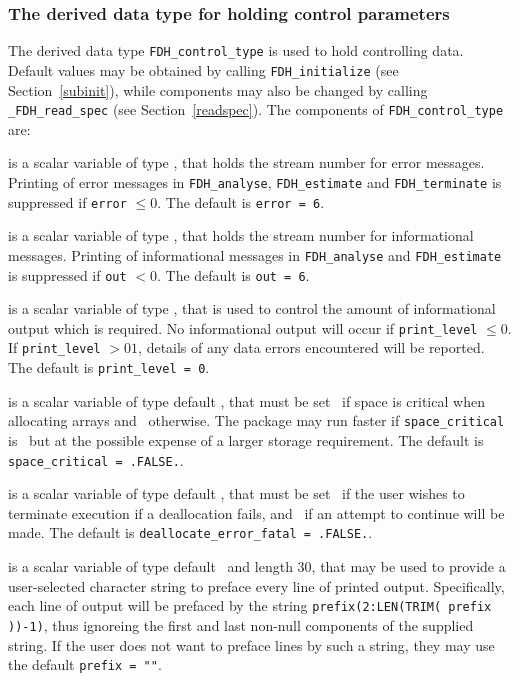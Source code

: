 \documentclass{galahad}
\newcommand{\packagename}{FDH}
\newcommand{\fullpackagename}{\libraryname\_\packagename}
\begin{document}

\subsubsection{The derived data type for holding control 
 parameters}\label{typecontrol}
The derived data type 
{\tt \packagename\_control\_type} 
is used to hold controlling data. Default values may be obtained by calling 
{\tt \packagename\_initialize}
(see Section~\ref{subinit}),
while components may also be changed by calling 
{\tt \fullpackagename\_read\-\_spec}
(see Section~\ref{readspec}). 
The components of 
{\tt \packagename\_control\_type} 
are:


\begin{description}

 is a scalar variable of type \integer, that holds the
stream number for error messages. Printing of error messages in 
{\tt \packagename\_analyse},
{\tt \packagename\_estimate} 
and {\tt \packagename\_terminate} 
is suppressed if {\tt error} $\leq 0$.
The default is {\tt error = 6}.

 is a scalar variable of type \integer, that holds the
stream number for informational messages. Printing of informational messages in 
{\tt \packagename\_analyse} and {\tt \packagename\_estimate} 
is suppressed if {\tt out} $< 0$.
The default is {\tt out = 6}.

 is a scalar variable of type \integer, that is used
to control the amount of informational output which is required. No 
informational output will occur if {\tt print\_level} $\leq 0$. If 
{\tt print\_level} $> 01$, details of any data errors encountered 
will be reported.
The default is {\tt print\_level = 0}.

 is a scalar variable of type default \logical, 
that must be set \true\ if space is critical when allocating arrays
and  \false\ otherwise. The package may run faster if 
{\tt space\_critical} is \false\ but at the possible expense of a larger
storage requirement. The default is {\tt space\_critical = .FALSE.}.

 is a scalar variable of type default \logical, 
that must be set \true\ if the user wishes to terminate execution if
a deallocation  fails, and \false\ if an attempt to continue
will be made. The default is {\tt deallocate\_error\_fatal = .FALSE.}.

 is a scalar variable of type default \character\
and length 30, that may be used to provide a user-selected 
character string to preface every line of printed output. 
Specifically, each line of output will be prefaced by the string 
{\tt prefix(2:LEN(TRIM( prefix ))-1)},
thus ignoreing the first and last non-null components of the
supplied string. If the user does not want to preface lines by such
a string, they may use the default {\tt prefix = ""}.

\end{description}
\end{document}
